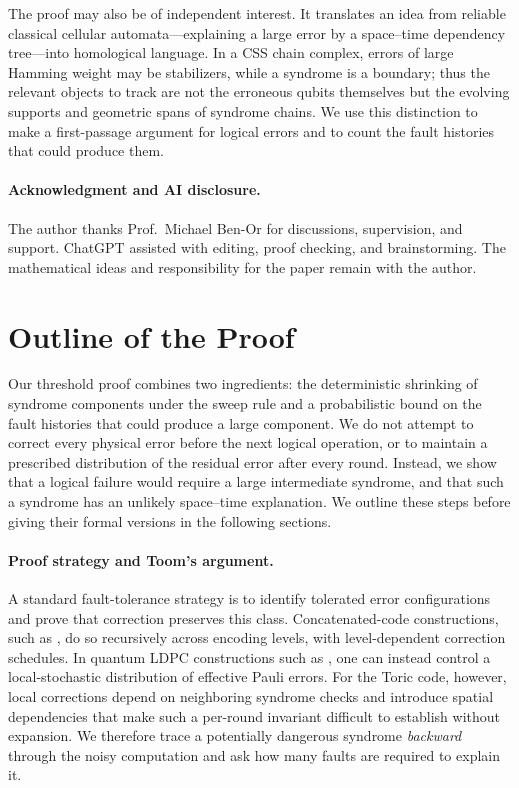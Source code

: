 The proof may also be of independent interest. It translates an idea from reliable classical cellular automata---explaining a large error by a space--time dependency tree---into homological language. In a CSS chain complex, errors of large Hamming weight may be stabilizers, while a syndrome is a boundary; thus the relevant objects to track are not the erroneous qubits themselves but the evolving supports and geometric spans of syndrome chains. We use this distinction to make a first-passage argument for logical errors and to count the fault histories that could produce them.

\paragraph{Acknowledgment and AI disclosure.}
The author thanks Prof.~Michael Ben-Or for discussions, supervision, and support. ChatGPT assisted with editing, proof checking, and brainstorming. The mathematical ideas and responsibility for the paper remain with the author.

\section{Outline of the Proof}

Our threshold proof combines two ingredients: the deterministic shrinking of syndrome components under the sweep rule and a probabilistic bound on the fault histories that could produce a large component. We do not attempt to correct every physical error before the next logical operation, or to maintain a prescribed distribution of the residual error after every round. Instead, we show that a logical failure would require a large intermediate syndrome, and that such a syndrome has an unlikely space--time explanation. We outline these steps before giving their formal versions in the following sections.

\paragraph{Proof strategy and Toom's argument.}
A standard fault-tolerance strategy is to identify tolerated error configurations and prove that correction preserves this class. Concatenated-code constructions, such as \cite{aharonov1999faulttolerant}, do so recursively across encoding levels, with level-dependent correction schedules. In quantum LDPC constructions such as \cite{grospellier:tel-03364419}, one can instead control a local-stochastic distribution of effective Pauli errors. For the Toric code, however, local corrections depend on neighboring syndrome checks and introduce spatial dependencies that make such a per-round invariant difficult to establish without expansion. We therefore trace a potentially dangerous syndrome \emph{backward} through the noisy computation and ask how many faults are required to explain it.

